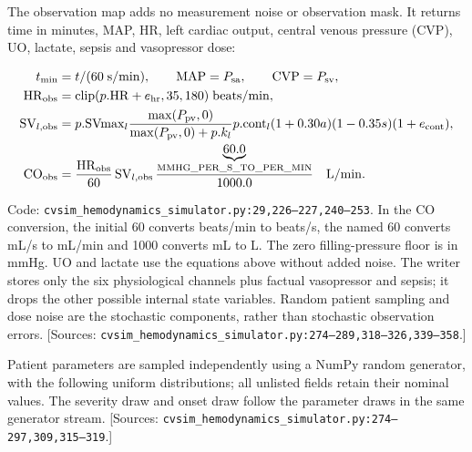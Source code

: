 The observation map adds no measurement noise or observation mask. It returns time in minutes, MAP, HR, left cardiac output, central venous pressure (CVP), UO, lactate, sepsis and vasopressor dose:

\[
\begin{aligned}
t_{\min}&=t/(60\;\mathrm{s/min}),\qquad \mathrm{MAP}=P_{\rm sa},\qquad \mathrm{CVP}=P_{\rm sv},\\
\mathrm{HR}_{\rm obs}&=\operatorname{clip}(p.\mathrm{HR}+e_{\rm hr},35,180)\;\mathrm{beats/min},\\
\mathrm{SV}_{l,\rm obs}&=p.\mathrm{SVmax}_l\frac{\max(P_{\rm pv},0)}{\max(P_{\rm pv},0)+p.k_l}
 p.\mathrm{cont}_l(1+0.30a)(1-0.35s)(1+e_{\rm cont}),\\
\mathrm{CO}_{\rm obs}&=\frac{\mathrm{HR}_{\rm obs}}{60}\,\mathrm{SV}_{l,\rm obs}\,
 \frac{\underbrace{60.0}_{\mathrm{MMHG\_PER\_S\_TO\_PER\_MIN}}}{1000.0}\quad\mathrm{L/min}.
\end{aligned}
\]


Code: \texttt{cvsim\_\allowbreak{}hemodynamics\_\allowbreak{}simulator.\allowbreak{}py:\allowbreak{}29,\allowbreak{}226–\allowbreak{}227,\allowbreak{}240–\allowbreak{}253}. In the CO conversion, the initial 60 converts beats/min to beats/s, the named 60 converts mL/s to mL/min and 1000 converts mL to L. The zero filling-pressure floor is in mmHg. UO and lactate use the equations above without added noise. The writer stores only the six physiological channels plus factual vasopressor and sepsis; it drops the other possible internal state variables. Random patient sampling and dose noise are the stochastic components, rather than stochastic observation errors. [Sources: \texttt{cvsim\_\allowbreak{}hemodynamics\_\allowbreak{}simulator.\allowbreak{}py:\allowbreak{}274–\allowbreak{}289,\allowbreak{}318–\allowbreak{}326,\allowbreak{}339–\allowbreak{}358}.]

Patient parameters are sampled independently using a NumPy random generator, with the following uniform distributions; all unlisted fields retain their nominal values. The severity draw and onset draw follow the parameter draws in the same generator stream. [Sources: \texttt{cvsim\_\allowbreak{}hemodynamics\_\allowbreak{}simulator.\allowbreak{}py:\allowbreak{}274–\allowbreak{}297,\allowbreak{}309,\allowbreak{}315–\allowbreak{}319}.]

